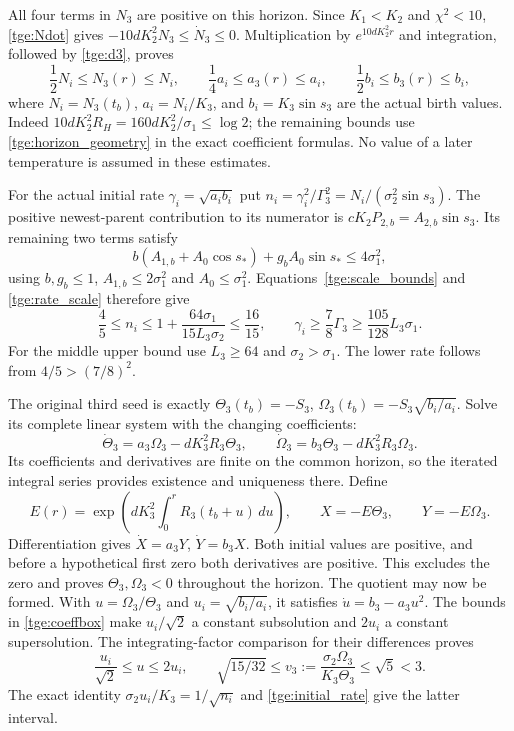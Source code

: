 All four terms in $N_3$ are positive on this horizon.
Since $K_1<K_2$ and $\chi^2<10$, \eqref{tge:Ndot} gives
$-10dK_2^2N_3\leq\dot N_3\leq0$.
Multiplication by $e^{10dK_2^2r}$ and integration, followed by
\eqref{tge:d3}, proves
\begin{equation}\label{tge:coeffbox}
 \frac12N_i\leq N_3(r)\leq N_i,\qquad
 \frac14a_i\leq a_3(r)\leq a_i,\qquad
 \frac12b_i\leq b_3(r)\leq b_i,
\end{equation}
where $N_i=N_3(t_b)$, $a_i=N_i/K_3$, and
$b_i=K_3\sin s_3$ are the actual birth values.
Indeed $10dK_2^2R_H=160dK_2^2/\sigma_1\leq\log2$;
the remaining bounds use \eqref{tge:horizon_geometry} in the exact
coefficient formulas. No value of a later temperature is assumed
in these estimates.

For the actual initial rate $\gamma_i=\sqrt{a_ib_i}$ put
$n_i=\gamma_i^2/\Gamma_3^2=N_i/(\sigma_2^2\sin s_3)$.
The positive newest-parent contribution to its numerator is
$cK_2P_{2,b}=A_{2,b}\sin s_3$.
Its remaining two terms satisfy
\[
 b(A_{1,b}+A_0\cos s_*)+g_bA_0\sin s_*\leq4\sigma_1^2,
\]
using $b,g_b\leq1$, $A_{1,b}\leq2\sigma_1^2$ and
$A_0\leq\sigma_1^2$.
Equations~\eqref{tge:scale_bounds} and \eqref{tge:rate_scale}
therefore give
\begin{equation}\label{tge:initial_rate}
 \frac45\leq n_i\leq1+\frac{64\sigma_1}{15L_3\sigma_2}
       \leq\frac{16}{15},\qquad
 \gamma_i\geq\frac78\Gamma_3
       \geq\frac{105}{128}L_3\sigma_1.
\end{equation}
For the middle upper bound use $L_3\geq64$ and $\sigma_2>\sigma_1$.
The lower rate follows from $4/5>(7/8)^2$.

The original third seed is exactly
$\Theta_3(t_b)=-S_3$, $\Omega_3(t_b)=-S_3\sqrt{b_i/a_i}$.
Solve its complete linear system with the changing coefficients:
\begin{equation}\label{tge:pair}
 \dot\Theta_3=a_3\Omega_3-dK_3^2R_3\Theta_3,
 \qquad\dot\Omega_3=b_3\Theta_3-dK_3^2R_3\Omega_3.
\end{equation}
Its coefficients and derivatives are finite on the common horizon,
so the iterated integral series provides existence and uniqueness
there. Define
\[
 E(r)=\exp\left(dK_3^2\int_0^r R_3(t_b+u)\,du\right),\qquad
 X=-E\Theta_3,\qquad Y=-E\Omega_3.
\]
Differentiation gives $\dot X=a_3Y$, $\dot Y=b_3X$.
Both initial values are positive, and before a hypothetical first zero
both derivatives are positive. This excludes the zero and proves
$\Theta_3,\Omega_3<0$ throughout the horizon. The quotient may now
be formed. With $u=\Omega_3/\Theta_3$ and $u_i=\sqrt{b_i/a_i}$,
it satisfies $\dot u=b_3-a_3u^2$. The bounds in
\eqref{tge:coeffbox} make $u_i/\sqrt2$ a constant subsolution and
$2u_i$ a constant supersolution. The integrating-factor comparison
for their differences proves
\begin{equation}\label{tge:quotient}
 \frac{u_i}{\sqrt2}\leq u\leq2u_i,
 \qquad \sqrt{15/32}\leq
       v_3:=\frac{\sigma_2\Omega_3}{K_3\Theta_3}\leq\sqrt5<3.
\end{equation}
The exact identity $\sigma_2u_i/K_3=1/\sqrt{n_i}$ and
\eqref{tge:initial_rate} give the latter interval.

